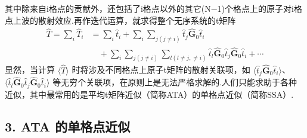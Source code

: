 其中除来自i格点的贡献外，还包括了i格点以外的其它(N−1)个格点上的原子对i格点上波的散射效应.再作迭代运算，就求得整个无序系统的t矩阵
\begin{equation}
\begin{aligned}
  \hat{T}=\sum_{i}\hat{T}_{i}
  &=\sum_{i}\hat{t}_{i}+\sum_{i}\sum_{j(j\neq i)}\hat{t}_{j}\hat{\boldsymbol{G}}_{0}\hat{t}_{i}\\
  &\quad+\sum_{i}\sum_{j(j\neq i)}\sum_{l(l\neq j,\neq i)}
  \hat{t}_{l}\hat{\boldsymbol{G}}_{0}\hat{t}_{j}\hat{\boldsymbol{G}}_{0}\hat{t}_{i}+\cdots
\end{aligned}
\end{equation}
显然，当计算 $\langle\hat{T}\rangle$ 时将涉及不同格点上原子t矩阵的散射关联项，如 $\langle\hat{t}_{j}\hat{\boldsymbol{G}}_{0}\hat{t}_{i}\rangle$、$\langle\hat{t}_{l}\hat{\boldsymbol{G}}_{0}\hat{t}_{j}\hat{\boldsymbol{G}}_{0}\hat{t}_{i}\rangle$ 等无穷个关联项，在原则上是无法严格求解的.人们只能求助于各种近似，其中最常用的是平均t矩阵近似（简称ATA）的单格点近似（简称SSA）.

\subsection*{3. ATA 的单格点近似}

